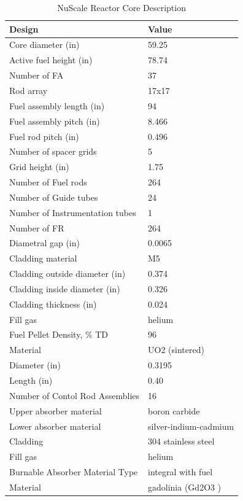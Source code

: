 \begin{table} [htbp]
\begin{center}

\caption{NuScale Reactor Core Description \cite{nuscale_chapter_2018}}
\label{Nutable}
\begin{tabular}{l     l}
\hline 
Design 		&Value \\ 
\hline 
Core diameter (in)			&59.25\\
Active fuel height (in)	&78.74\\

Number of FA 		&  37\\
Rod array   			&17x17\\
Fuel assembly length (in) &  94\\
Fuel assembly pitch (in)	&8.466\\
Fuel rod pitch (in)&0.496\\
Number of spacer grids&5\\
Grid height (in)&1.75\\
Number of Fuel rods&264\\
Number of Guide tubes&24\\
Number of Instrumentation tubes&1\\
\hline 
Number of FR&264\\
Diametral gap (in)&0.0065\\
Cladding material&M5\\
Cladding outside diameter (in)&0.374\\
Cladding inside diameter (in)&0.326\\
Cladding thickness (in)&0.024\\
Fill gas&helium\\
\hline 
Fuel Pellet Density, \% TD&96\\
Material&UO2 (sintered)\\
Diameter (in)&0.3195\\
Length (in) &0.40\\
\hline 
Number of Contol Rod Assemblies&16                              \\
Upper absorber material&boron carbide              \\
Lower absorber material&silver-indium-cadmium \\
Cladding&304 stainless steel      \\
Fill gas&helium                        \\
\hline 
Burnable Absorber Material Type&integral with fuel         \\
Material &gadolinia (Gd2O3 )      \\

\end{tabular}
\end{center}
\end{table}
